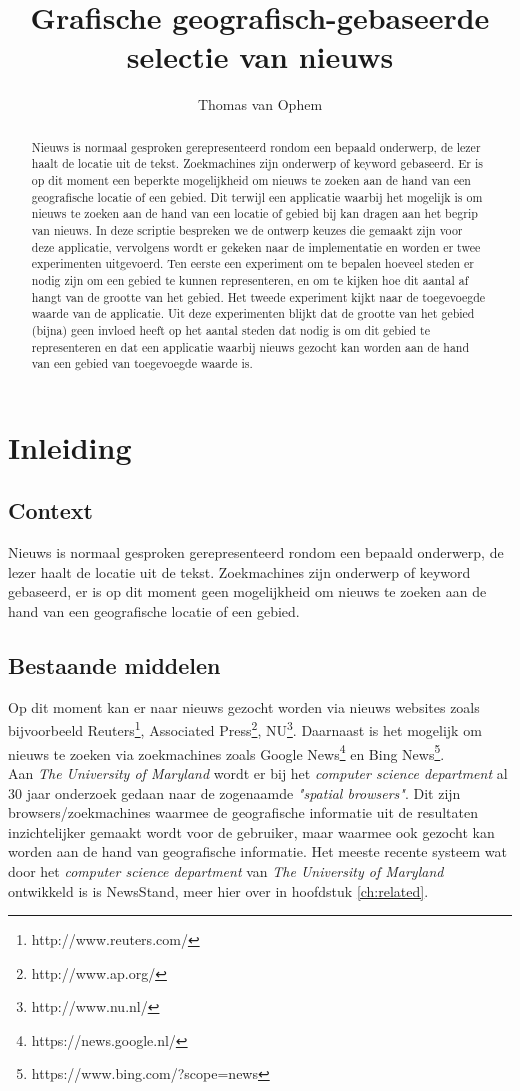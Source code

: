 \documentclass[twoside,openright]{uva-bachelor-thesis}
\title{Grafische geografisch-gebaseerde selectie van nieuws}
\author{Thomas van Ophem}
\begin{document}
\maketitle

\begin{abstract}
	Nieuws is normaal gesproken gerepresenteerd rondom een bepaald onderwerp, de lezer haalt de locatie uit de tekst. Zoekmachines zijn onderwerp of keyword gebaseerd. Er is op dit moment een beperkte mogelijkheid om nieuws te zoeken aan de hand van een geografische locatie of een gebied. Dit terwijl een applicatie waarbij het mogelijk is om nieuws te zoeken aan de hand van een locatie of gebied bij kan dragen aan het begrip van nieuws. In deze scriptie bespreken we de ontwerp keuzes die gemaakt zijn voor deze applicatie, vervolgens wordt er gekeken naar de implementatie en worden er twee experimenten uitgevoerd. Ten eerste een experiment om te bepalen hoeveel steden er nodig zijn om een gebied te kunnen representeren, en om te kijken hoe dit aantal af hangt van de grootte van het gebied. Het tweede experiment kijkt naar de toegevoegde waarde van de applicatie. Uit deze experimenten blijkt dat de grootte van het gebied (bijna) geen invloed heeft op het aantal steden dat nodig is om dit gebied te representeren en dat een applicatie waarbij nieuws gezocht kan worden aan de hand van een gebied van toegevoegde waarde is.
\end{abstract}

\tableofcontents

\chapter{Inleiding}
	\section{Context}
		Nieuws is normaal gesproken gerepresenteerd rondom een bepaald onderwerp, de lezer haalt de locatie uit de tekst. Zoekmachines zijn onderwerp of keyword gebaseerd, er is op dit moment geen mogelijkheid om nieuws te zoeken aan de hand van een geografische locatie of een gebied.
	\section{Bestaande middelen}
		Op dit moment kan er naar nieuws gezocht worden via  nieuws websites zoals bijvoorbeeld Reuters\footnote{http://www.reuters.com/}, Associated Press\footnote{http://www.ap.org/}, NU\footnote{http://www.nu.nl/}. Daarnaast is het mogelijk om nieuws te zoeken via zoekmachines zoals Google News\footnote{https://news.google.nl/} en Bing News\footnote{https://www.bing.com/?scope=news}.
		\\[0.5cm]
		Aan \textit{The University of Maryland} wordt er bij het \textit{computer science department} al 30 jaar onderzoek gedaan naar de zogenaamde \textit{"spatial browsers"}. Dit zijn browsers/zoekmachines waarmee de geografische informatie uit de resultaten inzichtelijker gemaakt wordt voor de gebruiker, maar waarmee ook gezocht kan worden aan de hand van geografische informatie. Het meeste recente systeem wat door het \textit{computer science department} van \textit{The University of Maryland} ontwikkeld is is NewsStand, meer hier over in hoofdstuk \ref{ch:related}.
\end{document}
